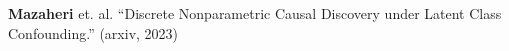 \documentclass[preview]{standalone}
\begin{document}
\begin{center}
\textbf{Mazaheri} et. al.  ``Discrete Nonparametric Causal Discovery under Latent Class Confounding.'' (arxiv, 2023)
\end{center}
\end{document}
